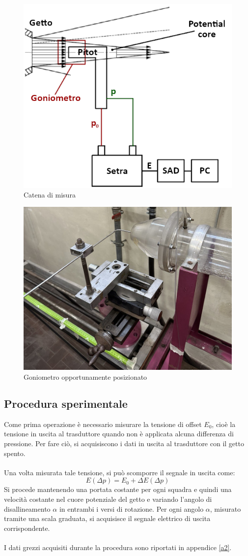 \newpage
\begin{figure}[ht]
    \centering
    \includegraphics[width=.65\textwidth]{images/2/catena.png}
    \caption{Catena di misura}
\end{figure}
\begin{figure}[h!]
    \centering
    \includegraphics[width=.65\textwidth]{images/2/goniometro.jpg}
    \caption{Goniometro opportunamente posizionato}
\end{figure}

\newpage
\subsection{Procedura sperimentale}
Come prima operazione è necessario misurare la tensione di offset $E_0$, cioè la tensione in uscita al trasduttore quando non è applicata alcuna differenza di pressione. Per fare ciò, si acquisiscono i dati in uscita al trasduttore con il getto spento.\\\\
Una volta misurata tale tensione, si può scomporre il segnale in uscita come:
\begin{equation*}
    E(\Delta p) = E_0 + \Delta E(\Delta p)
\end{equation*}
Si procede mantenendo una portata costante per ogni squadra e quindi una velocità costante nel cuore potenziale del getto e variando l'angolo di disallineamento $\alpha$ in entrambi i versi di rotazione. Per ogni angolo $\alpha$, misurato tramite una scala graduata, si acquisisce il segnale elettrico di uscita corrispondente.\\\\
I dati grezzi acquisiti durante la procedura sono riportati in appendice \ref{a2}.

